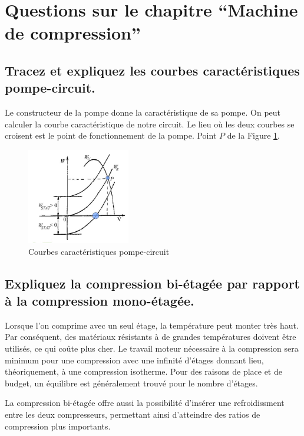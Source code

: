 \section{Questions sur le chapitre ``Machine de compression''}
\subsection{Tracez et expliquez les courbes caractéristiques pompe-circuit. \label{ssec:caracpompecircuit}}
Le constructeur de la pompe donne la caractéristique de sa pompe. On peut calculer la courbe caractéristique de notre circuit. Le lieu où les deux courbes se croisent est le point de fonctionnement de la pompe. Point $P$ de la Figure \ref{fig:carac_pompe_circuit}.
\begin{figure}[h]\centering
	\includegraphics[width=0.4\textwidth]{figures/carac_pompe_circuit.png}
	\caption{Courbes caractéristiques pompe-circuit}
	\label{fig:carac_pompe_circuit}
\end{figure}

\subsection{Expliquez la compression bi-étagée par rapport à la compression mono-étagée.}
Lorsque l'on comprime avec un seul étage, la température peut monter très haut. Par conséquent, des matériaux résistants à de grandes températures doivent être utilisés, ce qui coûte plus cher. Le travail moteur nécessaire à la compression sera minimum pour une compression avec une infinité d'étages donnant lieu, théoriquement, à une compression isotherme. Pour des raisons de place et de budget, un équilibre est généralement trouvé pour le nombre d'étages. 

La compression bi-étagée offre aussi la possibilité d'insérer une refroidissment entre les deux compresseurs, permettant ainsi d'atteindre des ratios de compression plus importants.

